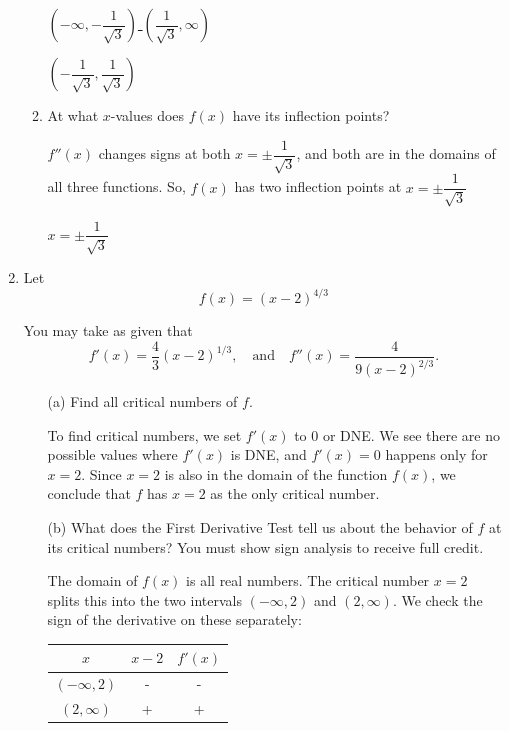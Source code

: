 \documentclass[11pt]{article}
\begin{document}
\begin{enumerate}
\begin{enumerate}
{    {\large
         \underline{$(-\infty, - \dfrac{1}{\sqrt{3}})$  $(\dfrac{1}{\sqrt{3}}, \infty)$}
    }

    {\large
         \underline{$(-\dfrac{1}{\sqrt{3}},\dfrac{1}{\sqrt{3}})$}
    }

}


    \item At what $x$-values does $f(x)$ have its inflection points?
{\color{blue} $f''(x)$ changes signs at both $x = \pm \dfrac{1}{\sqrt{3}}$, and both are in the domains of all three functions. So, $f(x)$ has two inflection points at $x = \pm \dfrac{1}{\sqrt{3}}$

    {\large
         \underline{$x = \pm \dfrac{1}{\sqrt{3}}$}
    }
 }   
\end{enumerate}


\newpage


\item Let 
\[
f(x) = (x - 2)^{4/3}
\]

You may take as given that
\[
f'(x) = \frac{4}{3}(x - 2)^{1/3} , \quad \text{and} \quad f''(x) = \frac{4}{9(x-2)^{2/3}}.
\]

\begin{enumerate}

\item[(a)] Find all critical numbers of $f$.
\smallskip

{\color{blue}
To find critical numbers, we set $f'(x)$ to 0 or DNE. We see there are no possible values where $f'(x)$ is DNE, and $f'(x) = 0$ happens only for $x=2$. Since $x=2$ is also in the domain of the function $f(x)$, we conclude that $f$ has $x=2$ as the only critical number.
}
\medskip


\item[(b)] What does the First Derivative Test tell us about the behavior of $f$ at its critical numbers?  
You must show sign analysis to receive full credit.
\smallskip

{\color{blue}
The domain of $f(x)$ is all real numbers. The critical number $x=2$ splits this into the two intervals $(-\infty, 2)$ and $(2, \infty)$. We check the sign of the derivative on these separately:
\begin{table}[h!]
    \centering
    \begin{tabular}{c|c|c}
      $x$  & $x-2$ & $f'(x)$\\
      \hline
        $(-\infty, 2)$ & -  & - \\
        $(2, \infty)$ & +  &  + \\
    \end{tabular}
\end{table}

}
\end{enumerate}
\end{enumerate}
\end{document}
